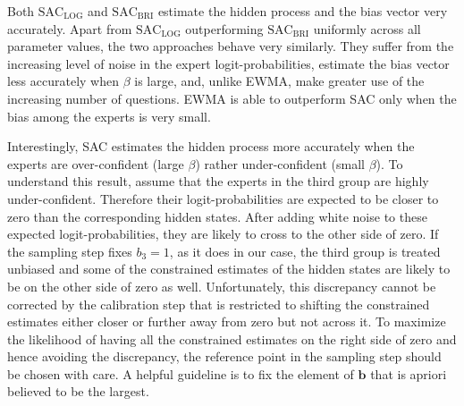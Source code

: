 \documentclass[aoas, preprint]{imsart}
\numberwithin{equation}{section}
\theoremstyle{plain}
\begin{document}
Both $\text{SAC}_{\text{LOG}}$ and  $\text{SAC}_{\text{BRI}}$ estimate the hidden process and the bias vector very accurately. Apart from $\text{SAC}_{\text{LOG}}$ outperforming $\text{SAC}_{\text{BRI}}$ uniformly across all parameter values, the two approaches behave very similarly.  They suffer  from the increasing level of noise in the expert logit-probabilities, estimate the bias vector less accurately when $\beta$ is large, and, unlike EWMA, make greater use of the increasing number of questions.  EWMA is able to outperform SAC only when the bias among the experts is very small. 

Interestingly, SAC estimates the hidden process more accurately when the experts are over-confident (large $\beta$) rather under-confident (small $\beta$). To understand this result, assume that the experts in the third group are highly under-confident. Therefore their logit-probabilities are expected to be closer to zero than the corresponding hidden states. After adding white noise to these expected logit-probabilities, they are likely to cross to the other side of zero. If the sampling step fixes $b_3 = 1$, as it does in our case, the third group is treated unbiased and some of the constrained estimates of the hidden states are likely to be on the other side of zero as well. Unfortunately, this discrepancy cannot be corrected by the calibration step that is restricted to shifting the constrained estimates either closer or further away from zero but not across it. To maximize the likelihood of having all the constrained estimates on the right side of zero and hence avoiding the discrepancy, the reference point in the sampling step should be chosen with care. A helpful guideline is to fix the element of $\boldsymbol{b}$ that is apriori believed  to be the largest. 



%
%
%
%
\end{document}

